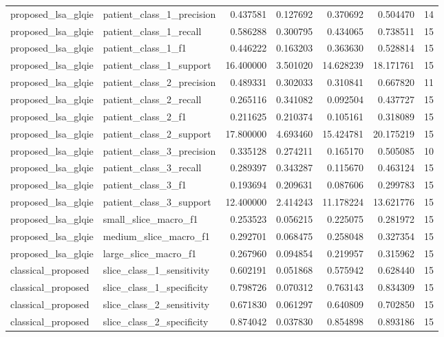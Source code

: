 \begin{tabular}{llrrrrr}
proposed_lsa_glqie & patient_class_1_precision & 0.437581 & 0.127692 & 0.370692 & 0.504470 & 14 \\
proposed_lsa_glqie & patient_class_1_recall & 0.586288 & 0.300795 & 0.434065 & 0.738511 & 15 \\
proposed_lsa_glqie & patient_class_1_f1 & 0.446222 & 0.163203 & 0.363630 & 0.528814 & 15 \\
proposed_lsa_glqie & patient_class_1_support & 16.400000 & 3.501020 & 14.628239 & 18.171761 & 15 \\
proposed_lsa_glqie & patient_class_2_precision & 0.489331 & 0.302033 & 0.310841 & 0.667820 & 11 \\
proposed_lsa_glqie & patient_class_2_recall & 0.265116 & 0.341082 & 0.092504 & 0.437727 & 15 \\
proposed_lsa_glqie & patient_class_2_f1 & 0.211625 & 0.210374 & 0.105161 & 0.318089 & 15 \\
proposed_lsa_glqie & patient_class_2_support & 17.800000 & 4.693460 & 15.424781 & 20.175219 & 15 \\
proposed_lsa_glqie & patient_class_3_precision & 0.335128 & 0.274211 & 0.165170 & 0.505085 & 10 \\
proposed_lsa_glqie & patient_class_3_recall & 0.289397 & 0.343287 & 0.115670 & 0.463124 & 15 \\
proposed_lsa_glqie & patient_class_3_f1 & 0.193694 & 0.209631 & 0.087606 & 0.299783 & 15 \\
proposed_lsa_glqie & patient_class_3_support & 12.400000 & 2.414243 & 11.178224 & 13.621776 & 15 \\
proposed_lsa_glqie & small_slice_macro_f1 & 0.253523 & 0.056215 & 0.225075 & 0.281972 & 15 \\
proposed_lsa_glqie & medium_slice_macro_f1 & 0.292701 & 0.068475 & 0.258048 & 0.327354 & 15 \\
proposed_lsa_glqie & large_slice_macro_f1 & 0.267960 & 0.094854 & 0.219957 & 0.315962 & 15 \\
classical_proposed & slice_class_1_sensitivity & 0.602191 & 0.051868 & 0.575942 & 0.628440 & 15 \\
classical_proposed & slice_class_1_specificity & 0.798726 & 0.070312 & 0.763143 & 0.834309 & 15 \\
classical_proposed & slice_class_2_sensitivity & 0.671830 & 0.061297 & 0.640809 & 0.702850 & 15 \\
classical_proposed & slice_class_2_specificity & 0.874042 & 0.037830 & 0.854898 & 0.893186 & 15 \\

\end{tabular}
